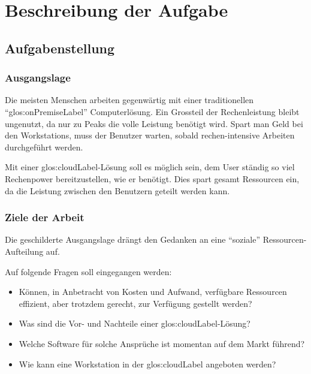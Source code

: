 \chapter{Beschreibung der Aufgabe}

\section{Aufgabenstellung}


\subsection{Ausgangslage}
Die meisten Menschen arbeiten gegenwärtig mit einer traditionellen "`\gls{glos:onPremiseLabel}"' Computerlösung.
Ein Grossteil der Rechenleistung bleibt ungenutzt, da nur zu Peaks die volle Leistung benötigt wird.
Spart man Geld bei den Workstations, muss der Benutzer warten, sobald rechen-intensive Arbeiten durchgeführt werden.

Mit einer \Gls{glos:cloudLabel}-Lösung soll es möglich sein, dem User ständig so viel Rechenpower bereitzustellen, wie er benötigt.
Dies spart gesamt Ressourcen ein, da die Leistung zwischen den Benutzern geteilt werden kann.

\subsection{Ziele der Arbeit}
\label{sec:desc:targets}
Die geschilderte Ausgangslage drängt den Gedanken an eine “soziale” Ressourcen-Aufteilung auf.

Auf folgende Fragen soll eingegangen werden:
\begin{itemize}
	\item Können, in Anbetracht von Kosten und Aufwand, verfügbare Ressourcen effizient, aber trotzdem gerecht, zur Verfügung gestellt werden?
	\item Was sind die Vor- und Nachteile einer \Gls{glos:cloudLabel}-Lösung?
	\item Welche Software für solche Ansprüche ist momentan auf dem Markt führend?
	\item Wie kann eine Workstation in der \Gls{glos:cloudLabel} angeboten werden?
\end{itemize}



